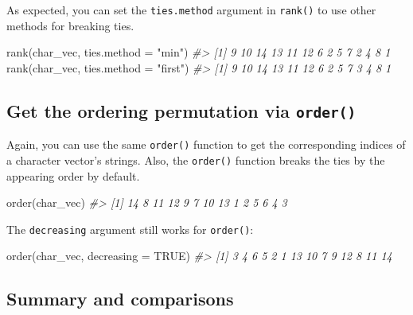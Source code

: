 \documentclass[
]{book}
\newenvironment{Shaded}{\begin{snugshade}}{\end{snugshade}}
\newcommand{\AttributeTok}[1]{\textcolor[rgb]{0.77,0.63,0.00}{#1}}
\newcommand{\CommentTok}[1]{\textcolor[rgb]{0.56,0.35,0.01}{\textit{#1}}}
\newcommand{\ConstantTok}[1]{\textcolor[rgb]{0.00,0.00,0.00}{#1}}
\newcommand{\FunctionTok}[1]{\textcolor[rgb]{0.00,0.00,0.00}{#1}}
\newcommand{\NormalTok}[1]{#1}
\newcommand{\StringTok}[1]{\textcolor[rgb]{0.31,0.60,0.02}{#1}}
\begin{document}
As expected, you can set the \texttt{ties.method} argument in \texttt{rank()} to use other methods for breaking ties.

\begin{Shaded}
\begin{Highlighting}[]
\FunctionTok{rank}\NormalTok{(char\_vec, }\AttributeTok{ties.method =} \StringTok{"min"}\NormalTok{)}
\CommentTok{\#\textgreater{}  [1]  9 10 14 13 11 12  6  2  5  7  2  4  8  1}
\FunctionTok{rank}\NormalTok{(char\_vec, }\AttributeTok{ties.method =} \StringTok{"first"}\NormalTok{)}
\CommentTok{\#\textgreater{}  [1]  9 10 14 13 11 12  6  2  5  7  3  4  8  1}
\end{Highlighting}
\end{Shaded}

\hypertarget{get-the-ordering-permutation-via-order-1}{%
\subsection{\texorpdfstring{Get the ordering permutation via \texttt{order()}}{Get the ordering permutation via order()}}\label{get-the-ordering-permutation-via-order-1}}

Again, you can use the same \texttt{order()} function to get the corresponding indices of a character vector's strings. Also, the \texttt{order()} function breaks the ties by the appearing order by default.

\begin{Shaded}
\begin{Highlighting}[]
\FunctionTok{order}\NormalTok{(char\_vec)}
\CommentTok{\#\textgreater{}  [1] 14  8 11 12  9  7 10 13  1  2  5  6  4  3}
\end{Highlighting}
\end{Shaded}

The \texttt{decreasing} argument still works for \texttt{order()}:

\begin{Shaded}
\begin{Highlighting}[]
\FunctionTok{order}\NormalTok{(char\_vec, }\AttributeTok{decreasing =} \ConstantTok{TRUE}\NormalTok{)}
\CommentTok{\#\textgreater{}  [1]  3  4  6  5  2  1 13 10  7  9 12  8 11 14}
\end{Highlighting}
\end{Shaded}

\hypertarget{summary-and-comparisons}{%
\subsection{Summary and comparisons}\label{summary-and-comparisons}}
\end{document}
